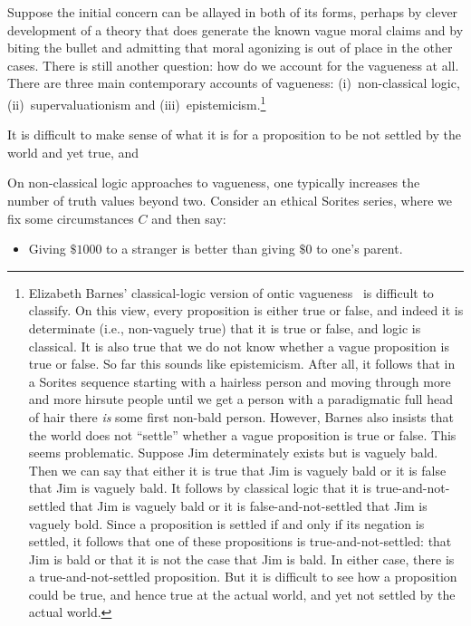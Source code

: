 Suppose the initial concern can be allayed in both of its forms, perhaps by clever development of a theory that does generate
the known vague moral claims and by biting the bullet and admitting that moral agonizing is out of place in the other cases. 
There is still another question: how do we account for the vagueness at all. There are three main contemporary accounts of vagueness:
(i)~non-classical logic, (ii)~supervaluationism and (iii)~epistemicism.\footnote{Elizabeth Barnes' classical-logic
version of ontic vagueness~\cite{BarnesOntic} is difficult to classify. On this view, every proposition is either
true or false, and indeed it is determinate (i.e., non-vaguely true) that it is true or false, and logic is classical. 
It is also true that we do not know whether a vague proposition is true or false. So far this sounds like 
epistemicism. After all, it follows that in a Sorites sequence starting with a hairless person and moving through
more and more hirsute people until we get a person with a paradigmatic full head of hair there \textit{is}
some first non-bald person. However, Barnes also  insists that the world does not ``settle'' whether a vague proposition is true 
or false. This seems problematic. Suppose Jim determinately exists but is vaguely bald. Then we can say that either it is true that 
Jim is vaguely bald or it is false that Jim is vaguely bald. It follows by classical logic that it is 
true-and-not-settled that Jim is vaguely bald or it is false-and-not-settled that Jim is vaguely bold. 
Since a proposition is settled if and only if its negation is settled, it follows that one of these
propositions is true-and-not-settled: that Jim is bald or that it is not the case that Jim is bald. In
either case, there is a true-and-not-settled proposition. But it is difficult to see how a proposition
could be true, and hence true at the actual world, and yet not settled by the actual world.}

It is 
difficult to make sense of what it is for a proposition to be not settled by the world and yet true, and 

On non-classical logic approaches to vagueness, one typically increases the number of truth values beyond two. 
Consider an ethical Sorites
series, where we fix some circumstances $C$ and then say:
\begin{itemize}
\item[($A_0$)] Giving $ \$1000$ to a stranger is better than giving $ \$0$ to one's parent.
\end{itemize}


